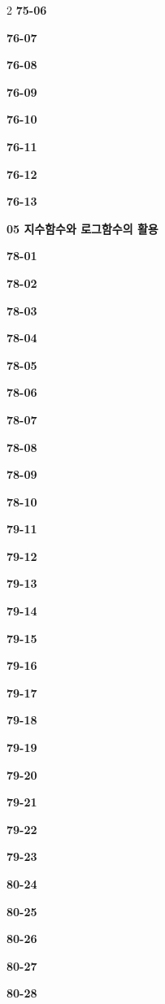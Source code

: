 \documentclass[10pt,a4paper]{article}
\begin{document}
\begin{multicols}{2}
\noindent\textbf{75-06}\ \par
\noindent\textbf{76-07}\ \par
\noindent\textbf{76-08}\ \par
\noindent\textbf{76-09}\ \par
\noindent\textbf{76-10}\ \par
\noindent\textbf{76-11}\ \par
\noindent\textbf{76-12}\ \par
\noindent\textbf{76-13}\ \par
\noindent\textbf{05 지수함수와 로그함수의 활용}\par\smallskip
\noindent\textbf{78-01}\ \par
\noindent\textbf{78-02}\ \par
\noindent\textbf{78-03}\ \par
\noindent\textbf{78-04}\ \par
\noindent\textbf{78-05}\ \par
\noindent\textbf{78-06}\ \par
\noindent\textbf{78-07}\ \par
\noindent\textbf{78-08}\ \par
\noindent\textbf{78-09}\ \par
\noindent\textbf{78-10}\ \par
\noindent\textbf{79-11}\ \par
\noindent\textbf{79-12}\ \par
\noindent\textbf{79-13}\ \par
\noindent\textbf{79-14}\ \par
\noindent\textbf{79-15}\ \par
\noindent\textbf{79-16}\ \par
\noindent\textbf{79-17}\ \par
\noindent\textbf{79-18}\ \par
\noindent\textbf{79-19}\ \par
\noindent\textbf{79-20}\ \par
\noindent\textbf{79-21}\ \par
\noindent\textbf{79-22}\ \par
\noindent\textbf{79-23}\ \par
\noindent\textbf{80-24}\ \par
\noindent\textbf{80-25}\ \par
\noindent\textbf{80-26}\ \par
\noindent\textbf{80-27}\ \par
\noindent\textbf{80-28}\ \par

\end{multicols}
\end{document}
